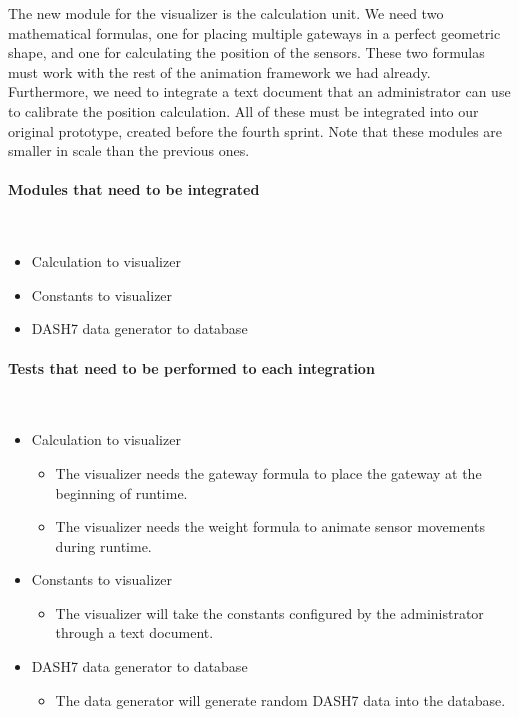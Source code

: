 \documentclass[../document]{subfiles}
\begin{document}
The new module for the visualizer is the calculation unit. We need two mathematical formulas, one for placing multiple gateways in a perfect geometric shape, and one for calculating the position of the sensors. These two formulas must work with the rest of the animation framework we had already. Furthermore, we need to integrate a text document that an administrator can use to calibrate the position calculation. All of these must be integrated into our original prototype, created before the fourth sprint. Note that these modules are smaller in scale than the previous ones.

\paragraph{Modules that need to be integrated} \ \\
\begin{itemize}
	\item
	Calculation to visualizer
	\item
	Constants to visualizer
	\item
	\gls{DASH7} data generator to database
\end{itemize}

\paragraph{Tests that need to be performed to each integration} \ \\
\begin{itemize}
	\item
	Calculation to visualizer
	\begin{itemize}
		\item
		The visualizer needs the gateway formula to place the gateway at the beginning of runtime.
		\item
		The visualizer needs the weight formula to animate sensor movements during runtime.
	\end{itemize}
	\item
	Constants to visualizer
	\begin{itemize}
		\item
		The visualizer will take the constants configured by the administrator through a text document.
	\end{itemize}
	\item
	\gls{DASH7} data generator to database
	\begin{itemize}
		\item
		The data generator will generate random \gls{DASH7} data into the database.
	\end{itemize}
\end{itemize}
\end{document}
